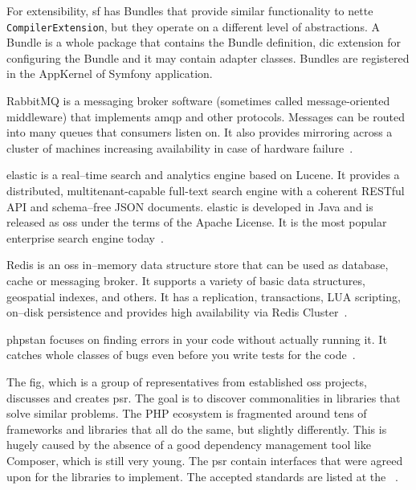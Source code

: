 For extensibility, \gls{sf} has Bundles that provide similar functionality to \gls{nette} \lstinline{CompilerExtension}, but they operate on a different level of abstractions. A Bundle is a whole package that contains the Bundle definition, \gls{dic} extension for configuring the Bundle and it may contain adapter classes. Bundles are registered in the AppKernel of Symfony application.

 \label{sec:theory:rabbitmq}

RabbitMQ is a messaging broker software (sometimes called message-oriented middleware) that implements \gls{amqp} and other protocols. Messages can be routed into many queues that consumers listen on. It also provides mirroring across a cluster of machines increasing availability in case of hardware failure~\cite{rabbitmq:features}.

 \label{sec:theory:elasticsearch}

\gls{elastic} is a real--time search and analytics engine based on Lucene. It provides a distributed, multitenant-capable full-text search engine with a coherent RESTful API and schema--free JSON documents. \gls{elastic} is developed in Java and is released as \gls{oss} under the terms of the Apache License. It is the most popular enterprise search engine today~\cite{gormley2015elasticsearch}.

 \label{sec:theory:redis}

Redis is an \gls{oss} in--memory data structure store that can be used as database, cache or messaging broker. It supports a variety of basic data structures, geospatial indexes, and others. It has a replication, transactions, LUA scripting, on--disk persistence and provides high availability via Redis Cluster~\cite{redis:about}.

 \label{sec:theory:phpstan}

\gls{phpstan} focuses on finding errors in your code without actually running it. It catches whole classes of bugs even before you write tests for the code~\cite{github:phpstan}.

 \label{sec:theory:psr}

The \gls{fig}, which is a group of representatives from established \gls{oss} projects, discusses and creates \gls{psr}. The goal is to discover commonalities in libraries that solve similar problems. The PHP ecosystem is fragmented around tens of frameworks and libraries that all do the same, but slightly differently. This is hugely caused by the absence of a good dependency management tool like Composer, which is still very young. The \gls{psr} contain interfaces that were agreed upon for the libraries to implement. The accepted standards are listed at the ~\cite{fig:psr}.

